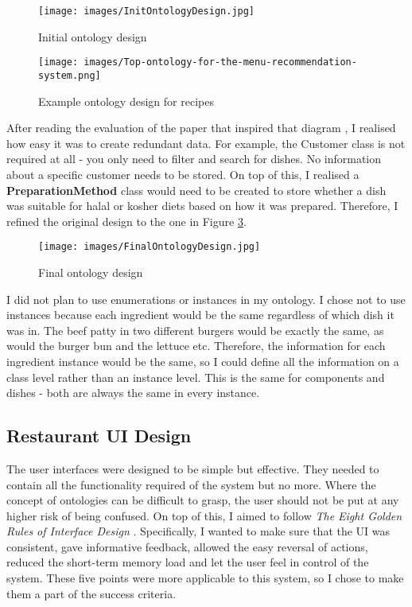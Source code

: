 \begin{figure}[h]
    \centering
    \captionsetup{justification=centering}
    \texttt{[image: images/InitOntologyDesign.jpg]}
    \caption{Initial ontology design}
    \label{fig:init_ontology_design}
\end{figure}

\begin{figure}[h]
    \centering
    \captionsetup{justification=centering}
    \texttt{[image: images/Top-ontology-for-the-menu-recommendation-system.png]}
    \caption{Example ontology design for recipes\cite{ontology_pitfalls}}
    \label{fig:recipe_ontology_design}
\end{figure}

After reading the evaluation of the paper that inspired that diagram \cite{ontology_pitfalls}, I realised how easy it was to create redundant data. For example, the Customer class is not required at all - you only need to filter and search for dishes. No information about a specific customer needs to be stored. On top of this, I realised a \textbf{PreparationMethod} class would need to be created to store whether a dish was suitable for halal or kosher diets based on how it was prepared. Therefore, I refined the original design to the one in Figure \ref{fig:final_ontology_design}.

\begin{figure}[h]
    \centering
    \captionsetup{justification=centering}
    \texttt{[image: images/FinalOntologyDesign.jpg]}
    \caption{Final ontology design}
    \label{fig:final_ontology_design}
\end{figure}

I did not plan to use enumerations or instances in my ontology. I chose not to use instances because each ingredient would be the same regardless of which dish it was in. The beef patty in two different burgers would be exactly the same, as would the burger bun and the lettuce etc. Therefore, the information for each ingredient instance would be the same, so I could define all the information on a class level rather than an instance level. This is the same for components and dishes - both are always the same in every instance.

\subsection{Restaurant UI Design}

The user interfaces were designed to be simple but effective. They needed to contain all the functionality required of the system but no more. Where the concept of ontologies can be difficult to grasp, the user should not be put at any higher risk of being confused. On top of this, I aimed to follow \textit{The Eight Golden Rules of Interface Design} \cite{shneiderman}. Specifically, I wanted to make sure that the UI was consistent, gave informative feedback, allowed the easy reversal of actions, reduced the short-term memory load and let the user feel in control of the system. These five points were more applicable to this system, so I chose to make them a part of the success criteria.

